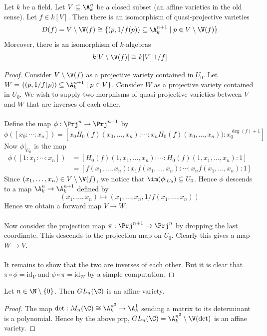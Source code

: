\documentclass[a4paper]{article}
\begin{document}
\begin{prp}{}{} Let $k$ be a field. Let $V\subseteq\A_k^n$ be a closed subset (an affine varieties in the old sense). Let $f\in k[V]$. Then there is an isomorphism of quasi-projective varieties $$D(f)=V\setminus\V(f)\cong\{(p,1/f(p))\subseteq\A_k^{n+1}\;|\;p\in V\setminus\V(f)\}$$ Moreover, there is an isomorphism of $k$-algebras $$k[V\setminus\V(f)]\cong k[V][1/f]$$ 
\begin{proof}
Consider $V\setminus\V(f)$ as a projective variety contained in $U_0$. Let $W=\{(p,1/f(p))\subseteq\A_k^{n+1}\;|\;p\in V\}$. Consider $W$ as a projective variety contained in $U_0$. We wish to supply two morphisms of quasi-projective varieties between $V$ and $W$ that are inverses of each other. \\~\\

Define the map $\phi:\Prj^n\to\Prj^{n+1}$ by $$\phi([x_0:\cdots:x_n])=\left[x_0H_0(f)(x_0,\dots,x_n):\cdots:x_nH_0(f)(x_0,\dots,x_n)):x_0^{\deg(f)+1}\right]$$ Now $\phi|_{U_0}$ is the map 
\begin{align*}
\phi([1:x_1:\cdots:x_n])&=\left[H_0(f)(1,x_1,\dots,x_n):\cdots:H_0(f)(1,x_1,\dots,x_n):1\right]\\
&=[f(x_1,\dots,x_n):x_1f(x_1,\dots,x_n):\cdots:x_nf(x_1,\dots,x_n):1]
\end{align*}
Since $(x_1,\dots,x_n)\in V\setminus\V(f)$, we notice that $\im(\phi|_{U_0})\subseteq U_0$. Hence $\phi$ descends to a map $\A_k^n\to\A_k^{n+1}$ defined by $$(x_1,\dots,x_n)\mapsto(x_1,\dots,x_n,1/f(x_1,\dots,x_n))$$ Hence we obtain a forward map $V\to W$. \\~\\

Now consider the projection map $\pi:\Prj^{n+1}\to\Prj^n$ by dropping the last coordinate. This descends to the projection map on $U_0$. Clearly this gives a map $W\to V$. \\~\\

It remains to show that the two are inverses of each other. But it is clear that $\pi\circ\phi=\text{id}_V$ and $\phi\circ\pi=\text{id}_W$ by a simple computation. 
\end{proof}
\end{prp}

\begin{eg}{}{} Let $n\in\N\setminus\{0\}$. Then $GL_n(\C)$ is an affine variety. 
\begin{proof}
The map $\det:M_n(\C)\cong\A_k^{n^2}\to\A_k^1$ sending a matrix to its determinant is a polynomial. Hence by the above prp, $GL_n(\C)=\A_k^{n^2}\setminus\V(\det)$ is an affine variety. 
\end{proof}
\end{eg}
\end{document}
